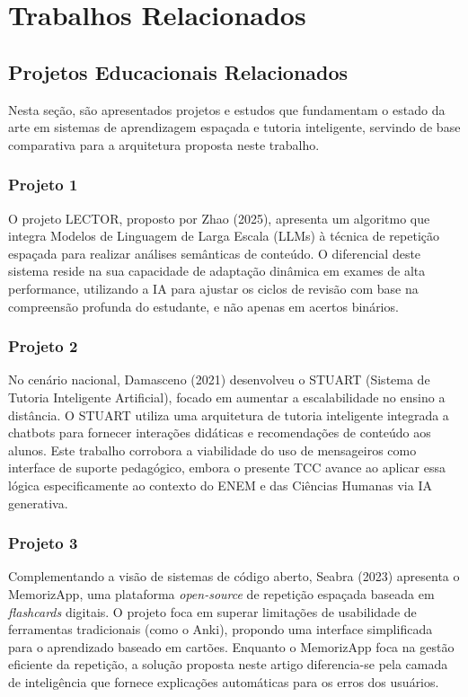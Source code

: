 \documentclass[
12pt,
openright,
oneside,
a4paper,
brazil
]{abntex2}
\begin{document}

\chapter{Trabalhos Relacionados}

\section{Projetos Educacionais Relacionados}

Nesta seção, são apresentados projetos e estudos que fundamentam o estado da arte em sistemas de aprendizagem espaçada e tutoria inteligente, servindo de base comparativa para a arquitetura proposta neste trabalho.

\subsection{Projeto 1}
O projeto LECTOR, proposto por Zhao\cite{zhao2025lector} (2025), apresenta um algoritmo que integra Modelos de Linguagem de Larga Escala (LLMs) à técnica de repetição espaçada para realizar análises semânticas de conteúdo. O diferencial deste sistema reside na sua capacidade de adaptação dinâmica em exames de alta performance, utilizando a IA para ajustar os ciclos de revisão com base na compreensão profunda do estudante, e não apenas em acertos binários.

\subsection{Projeto 2}
No cenário nacional, Damasceno\cite{damasceno2021stuart} (2021) desenvolveu o STUART (Sistema de Tutoria Inteligente Artificial), focado em aumentar a escalabilidade no ensino a distância. O STUART utiliza uma arquitetura de tutoria inteligente integrada a chatbots para fornecer interações didáticas e recomendações de conteúdo aos alunos. Este trabalho corrobora a viabilidade do uso de mensageiros como interface de suporte pedagógico, embora o presente TCC avance ao aplicar essa lógica especificamente ao contexto do ENEM e das Ciências Humanas via IA generativa.

\subsection{Projeto 3}
Complementando a visão de sistemas de código aberto, Seabra\cite{seabra2023memorizapp} (2023) apresenta o MemorizApp, uma plataforma \textit{open-source} de repetição espaçada baseada em \textit{flashcards} digitais. O projeto foca em superar limitações de usabilidade de ferramentas tradicionais (como o Anki), propondo uma interface simplificada para o aprendizado baseado em cartões. Enquanto o MemorizApp foca na gestão eficiente da repetição, a solução proposta neste artigo diferencia-se pela camada de inteligência que fornece explicações automáticas para os erros dos usuários.
\end{document}
